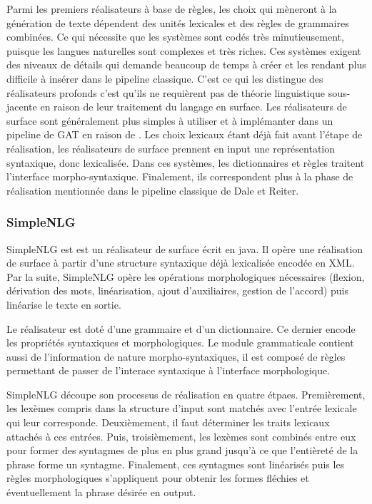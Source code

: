 Parmi les premiers réalisateurs à base de règles, les choix qui mèneront à la génération de texte dépendent des unités lexicales et des règles de grammaires combinées. Ce qui nécessite que les systèmes sont codés très minutieusement, puisque les langues naturelles sont complexes et très riches. Ces systèmes exigent des niveaux de détails qui demande beaucoup de temps à créer et les rendant plus difficile à insérer dans le pipeline classique. C'est ce qui les distingue des réalisateurs profonds c'est qu'ils ne requièrent pas de théorie linguistique sous-jacente en raison de leur traitement du langage en surface. Les réalisateurs de surface sont généralement plus simples à utiliser et à implémanter dans un pipeline de \ac{GAT} \citep{gatt18} en raison de . Les choix lexicaux étant déjà fait avant l'étape de réalisation, les réalisateurs de surface prennent en input une représentation syntaxique, donc lexicalisée. Dans ces systèmes, les dictionnaires et règles traitent l'interface morpho-syntaxique. Finalement, ils correspondent plus à la phase de réalisation mentionnée dans le pipeline classique de Dale et Reiter.

\subsubsection{SimpleNLG}
SimpleNLG est \citep{GattSimpleNLGRealisationEngine2009} est un réalisateur de surface écrit en java. Il opère une réalisation de surface à partir d'une structure syntaxique déjà lexicalisée encodée en XML. Par la suite, SimpleNLG opère les opérations morphologiques nécessaires (flexion, dérivation des mots, linéarisation, ajout d'auxiliaires, gestion de l'accord) puis linéarise le texte en sortie.

Le réalisateur est doté d'une grammaire et d'un dictionnaire. Ce dernier encode les propriétés syntaxiques et morphologiques. Le module grammaticale contient aussi de l'information de nature morpho-syntaxiques, il est composé de règles permettant de passer de l'interace syntaxique à l'interface morphologique.

SimpleNLG découpe son processus de réalisation en quatre étpaes. Premièrement, les lexèmes compris dans la structure d'input sont matchés avec l'entrée lexicale qui leur corresponde. Deuxièmement, il faut déterminer les traits lexicaux attachés à ces entrées. Puis, troisièmement, les lexèmes sont combinés entre eux pour former des syntagmes de plus en plus grand jusqu'à ce que l'entièreté de la phrase forme un syntagme. Finalement, ces syntagmes sont linéarisés puis les règles morphologiques s'appliquent pour obtenir les formes fléchies et éventuellement la phrase désirée en output.

